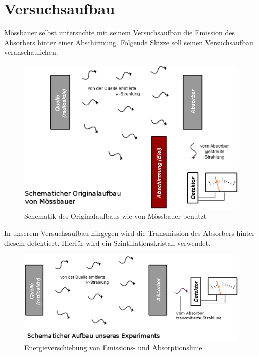 \documentclass[12pt]{article}
\begin{document}
\section{Versuchsaufbau}

Mössbauer selbst untersuchte mit seinem Versuchsaufbau die Emission des Absorbers hinter einer Abschirmung. Folgende Skizze soll seinen Versuchsaufbau veranschaulichen.

\begin{figure}[H]
 \includegraphics[width=0.9\linewidth]{pictures/moessbauer_original_aufbau.eps}
 \caption{Schematik des Originalaufbaus wie von Mössbauer benutzt}
\end{figure}

In unserem Versuchsaufbau hingegen wird die Transmission des Absorbers hinter diesem detektiert. Hierfür wird ein Szintillationskristall verwendet.

\begin{figure}[H]
 \includegraphics[width=0.9\linewidth]{pictures/unser_aufbau.eps}
 \caption{Energieverschiebung von Emissions- und Absorptionslinie}
\end{figure}
\end{document}
